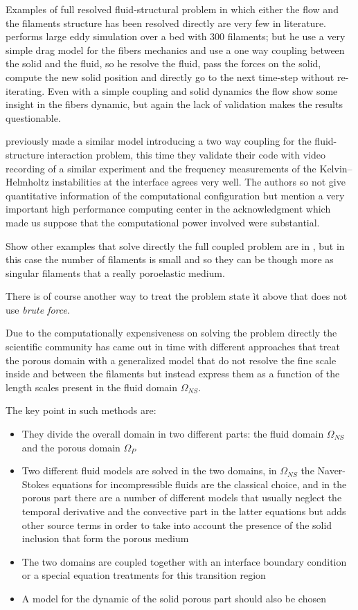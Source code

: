 Examples of full resolved fluid-structural problem in which either the flow and the filaments structure has been resolved directly are very few in literature.
\citet{marjoribanks2017does} performs large eddy simulation over a bed with $300$ filaments; but he use a very simple drag model for the fibers mechanics and use a one way coupling between the solid and the fluid, so he resolve the fluid, pass the forces on the solid, compute the new solid position and directly go to the next time-step without re-iterating.
Even with a simple coupling and solid dynamics the flow show some insight in the fibers dynamic, but again the lack of validation makes the results questionable.

\citet{dupont2010modelling} previously made a similar model introducing a two way coupling for the fluid-structure interaction problem, this time they validate their code with video recording of a similar experiment and the frequency measurements of the Kelvin–Helmholtz instabilities at the interface agrees very well.
The authors so not give quantitative information of the computational configuration but mention a very important high performance computing center in the acknowledgment which made us suppose that the computational power involved were substantial.

Show other examples that solve directly the full coupled problem are in \citet{pinelli2017pelskin} \citet{favier2017pelskin}, \citet{revell2017pelskin} but in this case the number of filaments is small and so they can be though more as singular filaments that a really poroelastic medium.

There is of course another way to treat the problem state ìt above that does not use \textit{brute force}.

Due to the computationally expensiveness on solving the problem directly the scientific community has came out in time with different approaches that treat the porous domain with a generalized model that do not resolve the fine scale inside and between the filaments but instead express them as a function of the length scales present in the fluid domain $\Omega_{NS}$.

The key point in such methods are:
\begin{itemize}
	\item They divide the overall domain in two different parts: the fluid domain $\Omega_{NS}$ and the porous domain $\Omega_{P}$
	\item Two different fluid models are solved in the two domains, in $\Omega_{NS}$ the Naver-Stokes equations for incompressible fluids are the classical choice, and in the porous part there are a number of different models that usually neglect the temporal derivative and the convective part in the latter equations but adds other source terms in order to take into account the presence of the solid inclusion that form the porous medium
	\item The two domains are coupled together with an interface boundary condition or a special equation treatments for this transition region
	\item A model for the dynamic of the solid porous part should also be chosen
\end{itemize}

